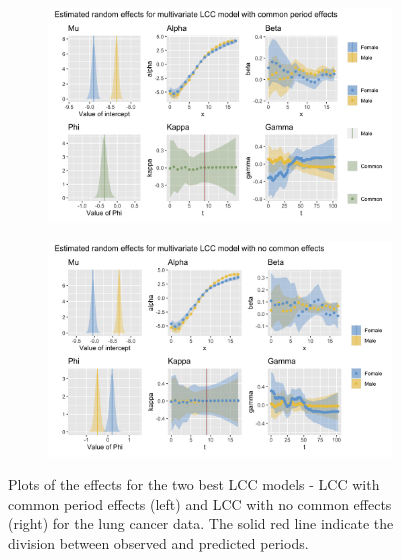 \begin{figure}
    \centering
    \begin{subfigure}[b]{.45\linewidth}
        \includegraphics[width=\linewidth]{real-data/real-data-multivariate/Figures/effects-LCC-common-period-stomach.png}
    \end{subfigure}
    \begin{subfigure}[b]{.45\linewidth}
        \includegraphics[width=\linewidth]{real-data/real-data-multivariate/Figures/effects-LCC-no-common-stomach.png}
    \end{subfigure}
    \caption{Plots of the effects for the two best LCC models - LCC with common period effects (left) and LCC with no common effects (right) for the lung cancer data. The solid red line indicate the division between observed and predicted periods. }
    \label{fig:effects-LCC-stomach}
\end{figure}


